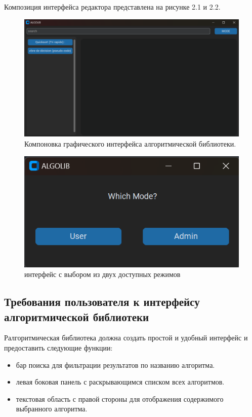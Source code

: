 \begin{enumerate}
\begin{itemize}
	\end{itemize}
	
	
	
	Композиция интерфейса редактора представлена на рисунке 2.1  и 2.2. 
	
	\begin{figure}[H]
		\centering
		\includegraphics[width=0.7\linewidth]{images/macpaint}
		\caption{Компоновка графического интерфейса алгоритмической библиотеки.}
		\label{fig:redac_comp}
	\end{figure}

	\begin{figure}[H]
		\centering
		\includegraphics[width=0.7\linewidth]{images/paint}
		\caption{интерфейс с выбором из двух доступных режимов}
		\label{fig:redac_comp}
	\end{figure}
	\newpage
	
	
	
	
	
	\subsection{Требования пользователя к интерфейсу алгоритмической библиотеки}
	
	Ралгоритмическая библиотека должна создать простой и удобный интерфейс и предоставить следующие функции:
	\begin{itemize}
	\item бар поиска для фильтрации результатов по названию алгоритма.
	\item левая боковая панель с раскрывающимся списком всех алгоритмов.
	\item текстовая область с правой стороны для отображения содержимого выбранного алгоритма.
	\end{itemize}
	

\end{enumerate}
